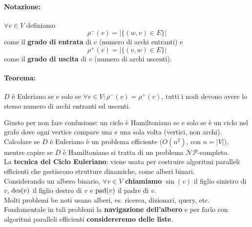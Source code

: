 \paragraph{Notazione:} $\forall v \in V$ definiamo 
$$\rho^- (v) = |\{(w,v) \in E\}|$$
come il \textbf{grado di entrata} di $v$ (numero di archi entranti) e 
$$\rho^+ (v) = |\{(v,w) \in E\}|$$
come il \textbf{grado di uscita} di $v$ (numero di archi uscenti).\\

\paragraph{Teorema:} $D$ è Euleriano se e solo se $\forall v \in V: \rho^- (v) = \rho^+ (v)$, tutti i nodi devono avere lo stesso numero di archi entranti ed uscenti.\\

\newpage

Giusto per non fare confusione: un ciclo è Hamiltoniano se e solo se è un ciclo nel grafo dove ogni vertice compare una e una sola volta (vertici, non archi).\\

Calcolare se $D$ è Euleriano è un problema efficiente ($O(n^2)$, con $n = |V|$), mentre capire se $D$ è Hamiltoniano si tratta di un problema $\mathcal{NP}$-completo.\\

La \textbf{tecnica del Ciclo Euleriano}: viene usata per costruire algoritmi paralleli efficienti che gestiscono strutture dinamiche, come alberi binari.\\

Considerando un albero binario, $\forall v \in V$ \textbf{chiamiamo} $\sin(v)$ il figlio sinistro di $v$, $\operatorname{des} (v)$ il figlio destro di $v$ e $\operatorname{pad}(v)$ il padre di $v$.\\

Molti problemi be noti usano alberi, es. ricerca, dizionari, query, etc.\\

Fondamentale in tali problemi la \textbf{navigazione dell'albero} e per farlo con algoritmi paralleli efficienti \textbf{considereremo delle liste}.\\

